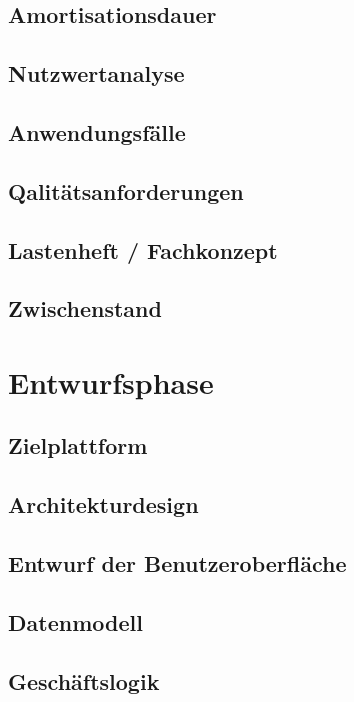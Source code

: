 \documentclass[12pt, xcolor=dvipsnames]{scrartcl}
\begin{document}
\subsection{Amortisationsdauer}

\subsection{Nutzwertanalyse}

\subsection{Anwendungsfälle}

\subsection{Qalitätsanforderungen}

\subsection{Lastenheft / Fachkonzept}

\subsection{Zwischenstand}

\section{Entwurfsphase}

\subsection{Zielplattform}

\subsection{Architekturdesign}

\subsection{Entwurf der Benutzeroberfläche}

\subsection{Datenmodell}

\subsection{Geschäftslogik}
\end{document}
